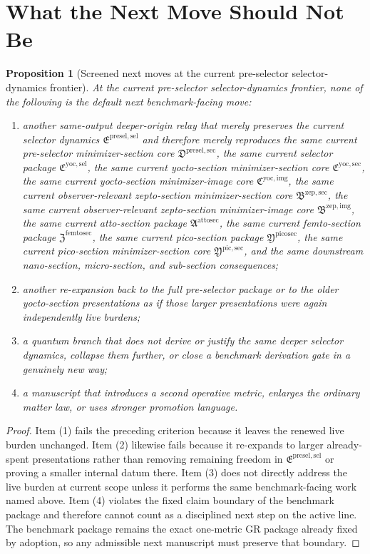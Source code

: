 \documentclass[11pt]{article}
\newcommand{\PreSelectorMinSectionCore}{\mathfrak D^{\mathrm{presel,sec}}}
\newcommand{\PreSectionSelectorPackage}{\mathfrak E^{\mathrm{presel,sel}}}
\newcommand{\YoctoSelectorPackage}{\mathfrak C^{\mathrm{yoc,sel}}}
\newcommand{\YoctoImageCore}{\mathfrak C^{\mathrm{yoc,img}}}
\newcommand{\YoctoMinSectionCore}{\mathfrak C^{\mathrm{yoc,sec}}}
\newcommand{\ZeptoImageCore}{\mathfrak B^{\mathrm{zep,img}}}
\newcommand{\ZeptoMinSectionCore}{\mathfrak B^{\mathrm{zep,sec}}}
\newcommand{\AttoSectionPackage}{\mathfrak A^{\mathrm{attosec}}}
\newcommand{\FemtoSectionPackage}{\mathfrak Z^{\mathrm{femtosec}}}
\newcommand{\PicoSectionPackage}{\mathfrak Y^{\mathrm{picosec}}}
\newcommand{\PicoMinSectionCore}{\mathfrak Y^{\mathrm{pic,sec}}}
\newtheorem{proposition}{Proposition}
\begin{document}
\section{What the Next Move Should Not Be}

\begin{proposition}[Screened next moves at the current pre-selector selector-dynamics frontier]
At the current pre-selector selector-dynamics frontier, none of the following is the default next benchmark-facing move:
\begin{enumerate}
    \item another same-output deeper-origin relay that merely preserves the current selector dynamics \(\PreSectionSelectorPackage\) and therefore merely reproduces the same current pre-selector minimizer-section core \(\PreSelectorMinSectionCore\), the same current selector package \(\YoctoSelectorPackage\), the same current yocto-section minimizer-section core \(\YoctoMinSectionCore\), the same current yocto-section minimizer-image core \(\YoctoImageCore\), the same current observer-relevant zepto-section minimizer-section core \(\ZeptoMinSectionCore\), the same current observer-relevant zepto-section minimizer-image core \(\ZeptoImageCore\), the same current atto-section package \(\AttoSectionPackage\), the same current femto-section package \(\FemtoSectionPackage\), the same current pico-section package \(\PicoSectionPackage\), the same current pico-section minimizer-section core \(\PicoMinSectionCore\), and the same downstream nano-section, micro-section, and sub-section consequences;
    \item another re-expansion back to the full pre-selector package or to the older yocto-section presentations as if those larger presentations were again independently live burdens;
    \item a quantum branch that does not derive or justify the same deeper selector dynamics, collapse them further, or close a benchmark derivation gate in a genuinely new way;
    \item a manuscript that introduces a second operative metric, enlarges the ordinary matter law, or uses stronger promotion language.
\end{enumerate}
\end{proposition}

\begin{proof}
Item (1) fails the preceding criterion because it leaves the renewed live burden unchanged. Item (2) likewise fails because it re-expands to larger already-spent presentations rather than removing remaining freedom in \(\PreSectionSelectorPackage\) or proving a smaller internal datum there. Item (3) does not directly address the live burden at current scope unless it performs the same benchmark-facing work named above. Item (4) violates the fixed claim boundary of the benchmark package and therefore cannot count as a disciplined next step on the active line. The benchmark package remains the exact one-metric GR package already fixed by adoption, so any admissible next manuscript must preserve that boundary.
\end{proof}
\end{document}
